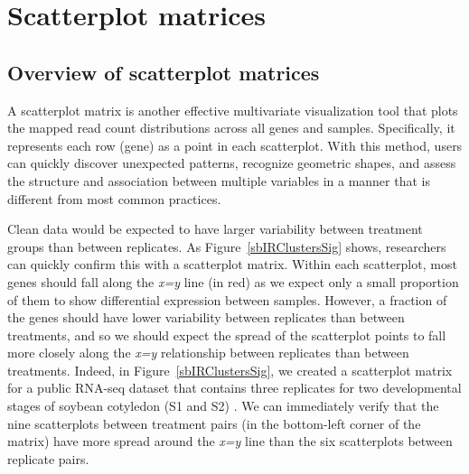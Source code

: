 \documentclass[11pt,a4paper,oldfontcommands,openany]{memoir}
\numberwithin{equation}{section} %
\begin{document}
\section{Scatterplot matrices}

\subsection{Overview of scatterplot matrices}

A scatterplot matrix is another effective multivariate visualization tool that plots the mapped read count distributions across all genes and samples. Specifically, it represents each row (gene) as a point in each scatterplot. With this method, users can quickly discover unexpected patterns, recognize geometric shapes, and assess the structure and association between multiple variables in a manner that is different from most common practices. 

Clean data would be expected to have larger variability between treatment groups than between replicates. As Figure~\ref{sbIRClustersSig} shows, researchers can quickly confirm this with a scatterplot matrix. Within each scatterplot, most genes should fall along the \textit{x=y} line (in red) as we expect only a small proportion of them to show differential expression between samples. However, a fraction of the genes should have lower variability between replicates than between treatments, and so we should expect the spread of the scatterplot points to fall more closely along the \textit{x=y} relationship between replicates than between treatments. Indeed, in Figure~\ref{sbIRClustersSig}, we created a scatterplot matrix for a public RNA-seq dataset that contains three replicates for two developmental stages of soybean cotyledon (S1 and S2) \citep{Brown}. We can immediately verify that the nine scatterplots between treatment pairs (in the bottom-left corner of the matrix) have more spread around the \textit{x=y} line than the six scatterplots between replicate pairs.
\end{document}
